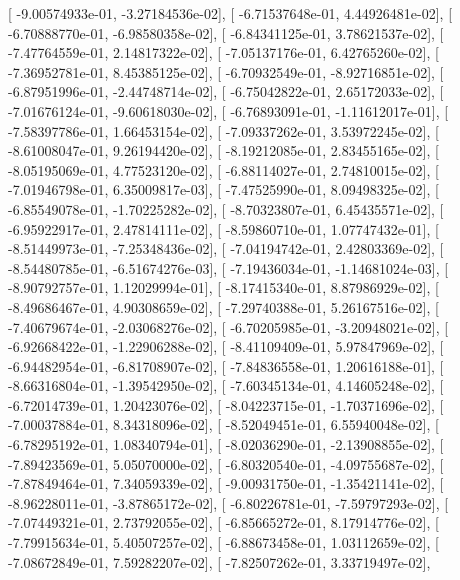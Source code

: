 \documentclass{article}
\begin{document}
       [ -9.00574933e-01,  -3.27184536e-02],
       [ -6.71537648e-01,   4.44926481e-02],
       [ -6.70888770e-01,  -6.98580358e-02],
       [ -6.84341125e-01,   3.78621537e-02],
       [ -7.47764559e-01,   2.14817322e-02],
       [ -7.05137176e-01,   6.42765260e-02],
       [ -7.36952781e-01,   8.45385125e-02],
       [ -6.70932549e-01,  -8.92716851e-02],
       [ -6.87951996e-01,  -2.44748714e-02],
       [ -6.75042822e-01,   2.65172033e-02],
       [ -7.01676124e-01,  -9.60618030e-02],
       [ -6.76893091e-01,  -1.11612017e-01],
       [ -7.58397786e-01,   1.66453154e-02],
       [ -7.09337262e-01,   3.53972245e-02],
       [ -8.61008047e-01,   9.26194420e-02],
       [ -8.19212085e-01,   2.83455165e-02],
       [ -8.05195069e-01,   4.77523120e-02],
       [ -6.88114027e-01,   2.74810015e-02],
       [ -7.01946798e-01,   6.35009817e-03],
       [ -7.47525990e-01,   8.09498325e-02],
       [ -6.85549078e-01,  -1.70225282e-02],
       [ -8.70323807e-01,   6.45435571e-02],
       [ -6.95922917e-01,   2.47814111e-02],
       [ -8.59860710e-01,   1.07747432e-01],
       [ -8.51449973e-01,  -7.25348436e-02],
       [ -7.04194742e-01,   2.42803369e-02],
       [ -8.54480785e-01,  -6.51674276e-03],
       [ -7.19436034e-01,  -1.14681024e-03],
       [ -8.90792757e-01,   1.12029994e-01],
       [ -8.17415340e-01,   8.87986929e-02],
       [ -8.49686467e-01,   4.90308659e-02],
       [ -7.29740388e-01,   5.26167516e-02],
       [ -7.40679674e-01,  -2.03068276e-02],
       [ -6.70205985e-01,  -3.20948021e-02],
       [ -6.92668422e-01,  -1.22906288e-02],
       [ -8.41109409e-01,   5.97847969e-02],
       [ -6.94482954e-01,  -6.81708907e-02],
       [ -7.84836558e-01,   1.20616188e-01],
       [ -8.66316804e-01,  -1.39542950e-02],
       [ -7.60345134e-01,   4.14605248e-02],
       [ -6.72014739e-01,   1.20423076e-02],
       [ -8.04223715e-01,  -1.70371696e-02],
       [ -7.00037884e-01,   8.34318096e-02],
       [ -8.52049451e-01,   6.55940048e-02],
       [ -6.78295192e-01,   1.08340794e-01],
       [ -8.02036290e-01,  -2.13908855e-02],
       [ -7.89423569e-01,   5.05070000e-02],
       [ -6.80320540e-01,  -4.09755687e-02],
       [ -7.87849464e-01,   7.34059339e-02],
       [ -9.00931750e-01,  -1.35421141e-02],
       [ -8.96228011e-01,  -3.87865172e-02],
       [ -6.80226781e-01,  -7.59797293e-02],
       [ -7.07449321e-01,   2.73792055e-02],
       [ -6.85665272e-01,   8.17914776e-02],
       [ -7.79915634e-01,   5.40507257e-02],
       [ -6.88673458e-01,   1.03112659e-02],
       [ -7.08672849e-01,   7.59282207e-02],
       [ -7.82507262e-01,   3.33719497e-02],
\end{document}
